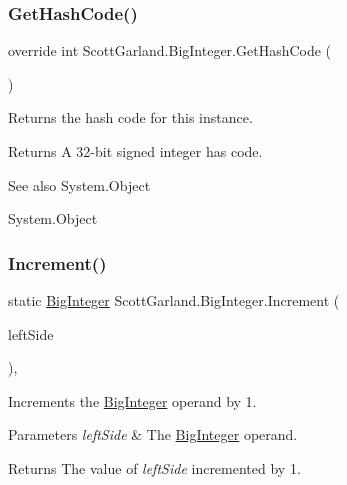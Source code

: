 \subsubsection{\texorpdfstring{Get\+Hash\+Code()}{GetHashCode()}}
{\footnotesize\ttfamily override int Scott\+Garland.\+Big\+Integer.\+Get\+Hash\+Code (\begin{DoxyParamCaption}{ }\end{DoxyParamCaption})\hspace{0.3cm}{\ttfamily [inline]}}



Returns the hash code for this instance. 

\begin{DoxyReturn}{Returns}
A 32-\/bit signed integer has code.
\end{DoxyReturn}
\begin{DoxySeeAlso}{See also}
System.\+Object


\end{DoxySeeAlso}
System.\+Object\mbox{\label{class_scott_garland_1_1_big_integer_a21e007e5a3c6fdd5c1fbd7daa41e9f8c}} 
\subsubsection{\texorpdfstring{Increment()}{Increment()}}
{\footnotesize\ttfamily static \hyperlink{class_scott_garland_1_1_big_integer}{Big\+Integer} Scott\+Garland.\+Big\+Integer.\+Increment (\begin{DoxyParamCaption}\item[{\hyperlink{class_scott_garland_1_1_big_integer}{Big\+Integer}}]{left\+Side }\end{DoxyParamCaption})\hspace{0.3cm}{\ttfamily [inline]}, {\ttfamily [static]}}



Increments the \hyperlink{class_scott_garland_1_1_big_integer}{Big\+Integer} operand by 1. 


\begin{DoxyParams}{Parameters}
{\em left\+Side} & The \hyperlink{class_scott_garland_1_1_big_integer}{Big\+Integer} operand.\\
\hline
\end{DoxyParams}
\begin{DoxyReturn}{Returns}
The value of {\itshape left\+Side}  incremented by 1.
\end{DoxyReturn}
\mbox{\label{class_scott_garland_1_1_big_integer_a1d2dd59a7603d7ceaecbf2b1c51bf7bd}} 
